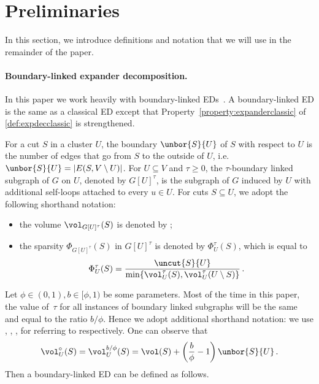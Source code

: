 \section{Preliminaries}
\label{sec:prelims}

In this section, we introduce definitions and notation that we will use in the remainder of the paper.

\paragraph{Boundary-linked expander decomposition.}
In this paper we work heavily with boundary-linked EDs~\cite{boundlink}. A boundary-linked ED is the same as a classical ED except that Property~\eqref{property:expanderclassic} of \cref{def:expdecclassic} is strengthened. 

For a cut $S$ in a cluster $U$, the boundary $\unbor{S}{U}$ of $S$ with respect to $U$ is the number of edges that go from $S$ to the outside of $U$, i.e. $\unbor{S}{U}=|E(S,V \setminus U)|$. For $U \subseteq V$ and $\tau \geq 0$, the $\tau$-boundary linked subgraph of $G$ on $U$, denoted by $G[U]^{\tau}$, is the subgraph of $G$ induced by $U$ with additional  self-loops attached to every $u \in U$.
	For cuts $S \subseteq U$, we adopt the following shorthand notation:
	\begin{itemize}
		\item the volume $\vol_{G[U]^{\tau}}(S)$ is denoted by ;
		\item the sparsity $\Phi_{G[U]^{\tau}}(S)$ in $G[U]^{\tau}$ is denoted by $\Phi_U^{\tau}(S)$, which is equal to
		\begin{equation*}
			\Phi_U^{\tau}(S) = \frac{\uncut{S}{U}}{\min\{\vol_U^{\tau}(S), \vol_U^{\tau}(U \setminus S)\}} \, .
		\end{equation*}
	\end{itemize}
Let $\phi \in (0,1), b \in [\phi, 1)$ be some parameters. Most of the time in this paper, the value of~$\tau$ for all instances of boundary linked subgraphs will be the same and equal to the ratio $b/\phi$. Hence we adopt additional shorthand notation: we use , , ,  for referring to  respectively.
One can observe that
\begin{equation*}
	\vol_U^\circ(S) = \vol_U^{b/\phi}(S) = \vol(S)+\left(\frac{b}{\phi}-1\right)\unbor{S}{U} \, .
\end{equation*}
\noindent
Then a boundary-linked ED can be defined as follows.

